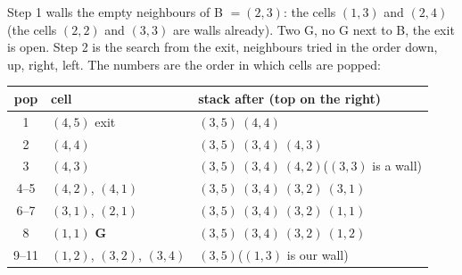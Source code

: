 \begin{tracebox}
Step 1 walls the empty neighbours of B $= (2,3)$: the cells $(1,3)$ and $(2,4)$ (the cells $(2,2)$ and $(3,3)$ are walls already). Two G, no G next to B, the exit is open. Step 2 is the search from the exit, neighbours tried in the order down, up, right, left. The numbers are the order in which cells are popped:
\begin{center}
\end{center}
\begin{center}\small
\begin{tabular}{@{}cll@{}}
\toprule
\textbf{pop} & \textbf{cell} & \textbf{stack after (top on the right)} \\
\midrule
1 & $(4,5)$ exit & $(3,5)\ (4,4)$ \\
2 & $(4,4)$ & $(3,5)\ (3,4)\ (4,3)$ \\
3 & $(4,3)$ & $(3,5)\ (3,4)\ (4,2)$\quad ($(3,3)$ is a wall) \\
4--5 & $(4,2)$, $(4,1)$ & $(3,5)\ (3,4)\ (3,2)\ (3,1)$ \\
6--7 & $(3,1)$, $(2,1)$ & $(3,5)\ (3,4)\ (3,2)\ (1,1)$ \\
8 & $(1,1)$ \textbf{G} & $(3,5)\ (3,4)\ (3,2)\ (1,2)$ \\
9--11 & $(1,2)$, $(3,2)$, $(3,4)$ & $(3,5)$\quad ($(1,3)$ is our wall) \\

\end{tabular}
\end{center}
\end{tracebox}
